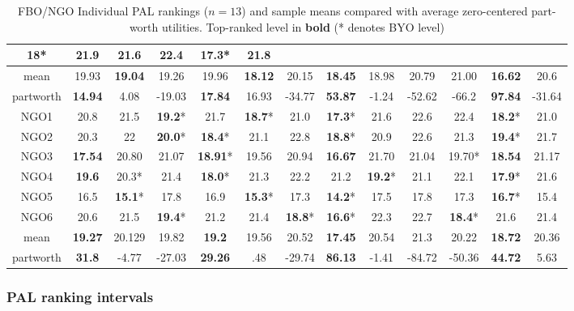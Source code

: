 \documentclass[a4paper, 12pt]{article}
\begin{document}
\begin{table}[!htpb]
\begin{tabular}{c|ccc|ccc|ccc|ccc}
{\bf 18}*&21.9&21.6&22.4&{\bf 17.3}*&21.8\\\hline
mean&19.93&{\bf 19.04}&19.26&19.96&{\bf 18.12}&20.15&{\bf 18.45}&18.98&20.79&21.00&{\bf 16.62}&20.6\\\hline
partworth&{\bf 14.94}&4.08&-19.03&{\bf 17.84}&16.93&-34.77&{\bf 53.87}&-1.24&-52.62&-66.2&{\bf 97.84}&-31.64\\\hline\hline
NGO1 &20.8&21.5&{\bf 19.2}*&21.7& {\bf 18.7}*&21.0&   {\bf 17.3}*&21.6&22.6&22.4&{\bf 18.2}*&21.0\\
NGO2 &20.3&22  &{\bf 20.0}*&{\bf 18.4}*& 21.1&22.8&   {\bf 18.8}*&20.9&22.6&21.3&{\bf 19.4}*&21.7\\
NGO3 &{\bf 17.54}&20.80&21.07&{\bf 18.91}*& 19.56&20.94&   {\bf 16.67}&21.70&21.04&19.70*&{\bf 18.54}&21.17\\
NGO4 &{\bf 19.6}&20.3*&21.4&{\bf 18.0}*& 21.3&22.2&   21.2&{\bf 19.2}*&21.1&22.1&{\bf 17.9}*&21.6\\
NGO5&16.5&{\bf 15.1}*&17.8&16.9&{\bf 15.3}*&
17.3&{\bf 14.2}*&17.5&17.8&17.3&{\bf 16.7}*&15.4\\
NGO6 &20.6&21.5&{\bf 19.4}*&21.2&21.4&{\bf 18.8}*&   {\bf 16.6}*&22.3&22.7&{\bf 18.4}*&21.6&21.4\\\hline
mean&{\bf 19.27}&20.129&19.82&{\bf 19.2}&19.56&20.52&{\bf 17.45}&20.54&21.3&20.22&{\bf 18.72}&20.36\\\hline
partworth& {\bf 31.8}&-4.77&-27.03&{\bf 29.26}&.48&-29.74&{\bf 86.13}&-1.41&-84.72&-50.36&{\bf 44.72}&5.63\\\hline
	\end{tabular}
\caption{FBO/NGO Individual PAL rankings ($n=13$) and sample means compared with average zero-centered part-worth utilities. Top-ranked level in {\bf bold} (* denotes BYO level)}
\label{PAL}
\end{table}

\subsubsection{PAL ranking intervals}
\end{document}
